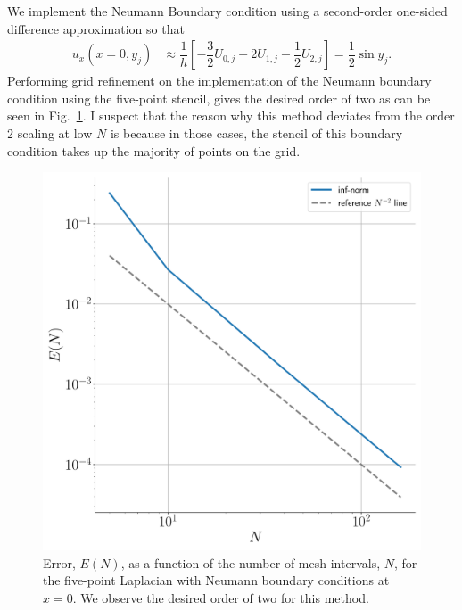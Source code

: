 \documentclass[12pt]{article}
\begin{document}
We implement the Neumann Boundary condition using a second-order one-sided difference approximation so that
\begin{align}
	u_{x}(x=0,y_{j}) &\approx \dfrac{1}{h}\left[-\dfrac{3}{2}U_{0,j}+2U_{1,j}-\dfrac{1}{2}U_{2,j}\right] = \dfrac{1}{2}\sin y_{j}.
\end{align}
Performing grid refinement on the implementation of the Neumann boundary condition using the five-point stencil, gives the desired order of two as can be seen in Fig.~\ref{fig:neumann_err_scaling}. I suspect that the reason why this method deviates from the order 2 scaling at low $N$ is because in those cases, the stencil of this boundary condition takes up the majority of points on the grid. 

\begin{figure}[!h]
	\centering
	\includegraphics[clip,scale=0.4]{q2c_err_fig.pdf}
	\caption{Error, $E(N)$, as a function of the number of mesh intervals, $N$, for the five-point Laplacian with Neumann boundary conditions at $x=0$. We observe the desired order of two for this method.}
	\label{fig:neumann_err_scaling}
\end{figure}
\end{document}
